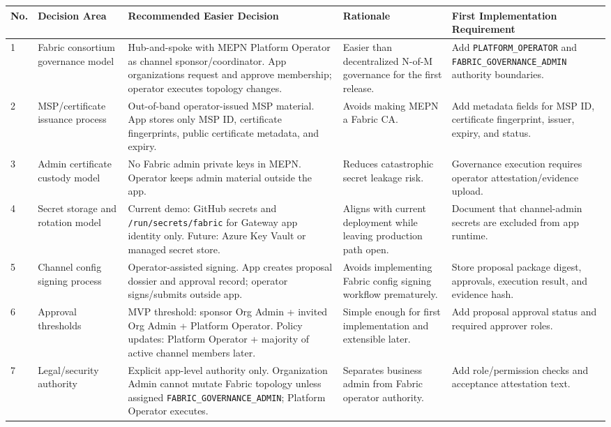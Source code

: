 \begin{longtable}{p{}p{}p{}p{}p{}}
\hline
\textbf{No.} & \textbf{Decision Area} & \textbf{Recommended Easier Decision} & \textbf{Rationale} & \textbf{First Implementation Requirement} \\
\hline
1 & Fabric consortium governance model & Hub-and-spoke with MEPN Platform Operator as channel sponsor/coordinator. App organizations request and approve membership; operator executes topology changes. & Easier than decentralized N-of-M governance for the first release. & Add \texttt{PLATFORM\_OPERATOR} and \texttt{FABRIC\_GOVERNANCE\_ADMIN} authority boundaries. \\
\hline
2 & MSP/certificate issuance process & Out-of-band operator-issued MSP material. App stores only MSP ID, certificate fingerprints, public certificate metadata, and expiry. & Avoids making MEPN a Fabric CA. & Add metadata fields for MSP ID, certificate fingerprint, issuer, expiry, and status. \\
\hline
3 & Admin certificate custody model & No Fabric admin private keys in MEPN. Operator keeps admin material outside the app. & Reduces catastrophic secret leakage risk. & Governance execution requires operator attestation/evidence upload. \\
\hline
4 & Secret storage and rotation model & Current demo: GitHub secrets and \texttt{/run/secrets/fabric} for Gateway app identity only. Future: Azure Key Vault or managed secret store. & Aligns with current deployment while leaving production path open. & Document that channel-admin secrets are excluded from app runtime. \\
\hline
5 & Channel config signing process & Operator-assisted signing. App creates proposal dossier and approval record; operator signs/submits outside app. & Avoids implementing Fabric config signing workflow prematurely. & Store proposal package digest, approvals, execution result, and evidence hash. \\
\hline
6 & Approval thresholds & MVP threshold: sponsor Org Admin + invited Org Admin + Platform Operator. Policy updates: Platform Operator + majority of active channel members later. & Simple enough for first implementation and extensible later. & Add proposal approval status and required approver roles. \\
\hline
7 & Legal/security authority & Explicit app-level authority only. Organization Admin cannot mutate Fabric topology unless assigned \texttt{FABRIC\_GOVERNANCE\_ADMIN}; Platform Operator executes. & Separates business admin from Fabric operator authority. & Add role/permission checks and acceptance attestation text. \\

\end{longtable}
